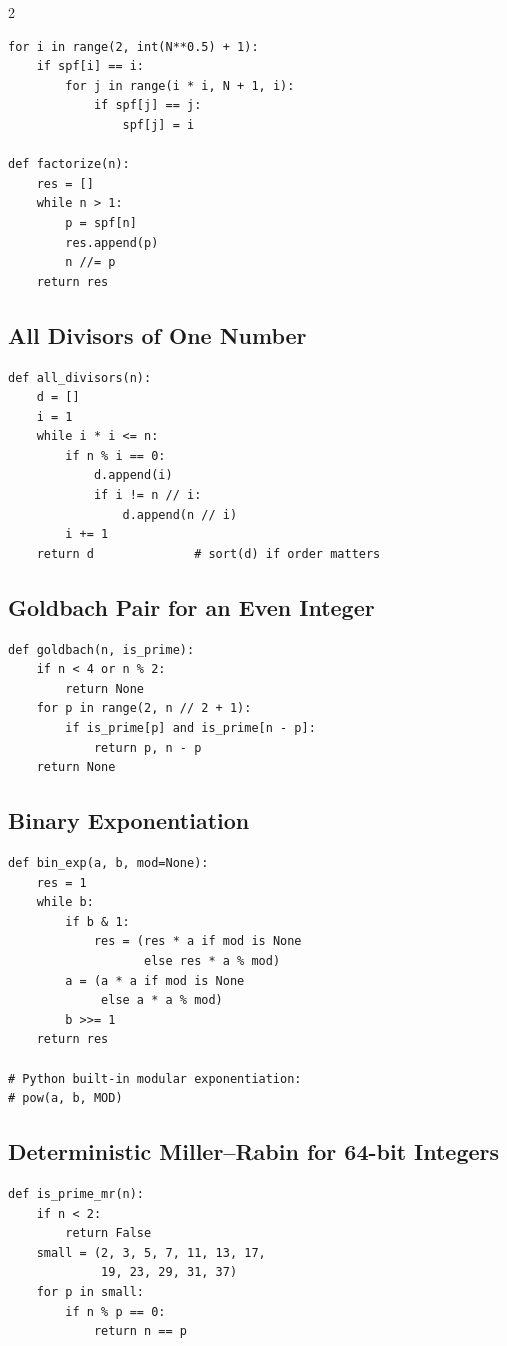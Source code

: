 \documentclass[9pt,a4paper]{extarticle}
\begin{document}
\begin{multicols}{2}
\begin{lstlisting}
for i in range(2, int(N**0.5) + 1):
    if spf[i] == i:
        for j in range(i * i, N + 1, i):
            if spf[j] == j:
                spf[j] = i

def factorize(n):
    res = []
    while n > 1:
        p = spf[n]
        res.append(p)
        n //= p
    return res
\end{lstlisting}

\subsection{All Divisors of One Number}
\begin{lstlisting}
def all_divisors(n):
    d = []
    i = 1
    while i * i <= n:
        if n % i == 0:
            d.append(i)
            if i != n // i:
                d.append(n // i)
        i += 1
    return d              # sort(d) if order matters
\end{lstlisting}

\subsection{Goldbach Pair for an Even Integer}
\begin{lstlisting}
def goldbach(n, is_prime):
    if n < 4 or n % 2:
        return None
    for p in range(2, n // 2 + 1):
        if is_prime[p] and is_prime[n - p]:
            return p, n - p
    return None
\end{lstlisting}

\subsection{Binary Exponentiation}
\begin{lstlisting}
def bin_exp(a, b, mod=None):
    res = 1
    while b:
        if b & 1:
            res = (res * a if mod is None
                   else res * a % mod)
        a = (a * a if mod is None
             else a * a % mod)
        b >>= 1
    return res

# Python built-in modular exponentiation:
# pow(a, b, MOD)
\end{lstlisting}

\subsection{Deterministic Miller--Rabin for 64-bit Integers}
\begin{lstlisting}
def is_prime_mr(n):
    if n < 2:
        return False
    small = (2, 3, 5, 7, 11, 13, 17,
             19, 23, 29, 31, 37)
    for p in small:
        if n % p == 0:
            return n == p


\end{lstlisting}
\end{multicols}
\end{document}
